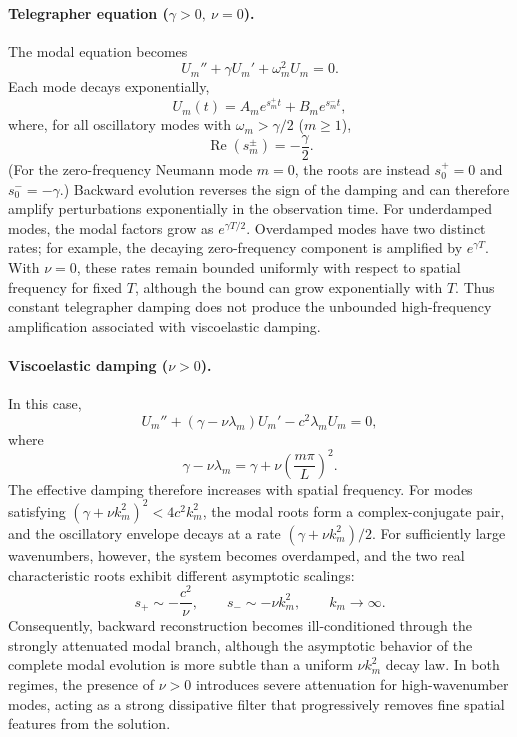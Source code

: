 \documentclass{Configuration_Files/PoliMi3i_thesis}
\newif\ifshowthesischanges
\DeclareRobustCommand{\thesischange}[2]{%
    \ifshowthesischanges
        \textcolor{#1}{#2}%
    \else
        #2%
    \fi
}
\def\thesischange#1#2{#2}%
\begin{document}
\paragraph{Telegrapher equation (\(\gamma>0,\ \nu=0\)).}

The modal equation becomes
\begin{equation*}
U_m''
+
\gamma U_m'
+
\omega_m^2U_m
=
0.
\end{equation*}
Each mode decays exponentially,
\begin{equation*}
U_m(t)
=
A_me^{s_m^+t}
+
B_me^{s_m^-t},
\end{equation*}
\thesischange{red}{where, for all oscillatory modes with $\omega_m > \gamma/2$ ($m \ge 1$),}
\begin{equation*}
\operatorname{Re}(s_m^\pm)
=
-\frac{\gamma}{2}.
\end{equation*}
\thesischange{red}{(For the zero-frequency Neumann mode $m=0$, the roots are instead $s_0^+ = 0$ and $s_0^- = -\gamma$.)}
Backward evolution reverses the sign of the damping and can therefore amplify perturbations exponentially in the observation time. For underdamped modes, the modal factors grow as \(e^{\gamma T/2}\). Overdamped modes have two distinct rates; for example, the decaying zero-frequency component is amplified by \(e^{\gamma T}\). With \(\nu=0\), these rates remain bounded uniformly with respect to spatial frequency for fixed \(T\), although the bound can grow exponentially with \(T\). Thus constant telegrapher damping does not produce the unbounded high-frequency amplification associated with viscoelastic damping.

\paragraph{Viscoelastic damping (\(\nu>0\)).}

In this case,
\begin{equation*}
U_m''
+
(\gamma-\nu\lambda_m)U_m'
-
c^2\lambda_mU_m
=
0,
\end{equation*}
where
\begin{equation*}
\gamma-\nu\lambda_m
=
\gamma
+
\nu
\left(\frac{m\pi}{L}\right)^2.
\end{equation*}
\thesischange{red}{The effective damping therefore increases with spatial frequency. For modes satisfying $(\gamma+\nu k_m^2)^2 < 4c^2k_m^2$, the modal roots form a complex-conjugate pair, and the oscillatory envelope decays at a rate $(\gamma+\nu k_m^2)/2$. For sufficiently large wavenumbers, however, the system becomes overdamped, and the two real characteristic roots exhibit different asymptotic scalings:
\begin{equation*}
    s_+ \sim -\frac{c^2}{\nu},
    \qquad
    s_- \sim -\nu k_m^2,
    \qquad k_m\rightarrow\infty.
\end{equation*}
Consequently, backward reconstruction becomes ill-conditioned through the strongly attenuated modal branch, although the asymptotic behavior of the complete modal evolution is more subtle than a uniform $\nu k_m^2$ decay law. In both regimes, the presence of $\nu > 0$ introduces severe attenuation for high-wavenumber modes, acting as a strong dissipative filter that progressively removes fine spatial features from the solution.}
\end{document}
